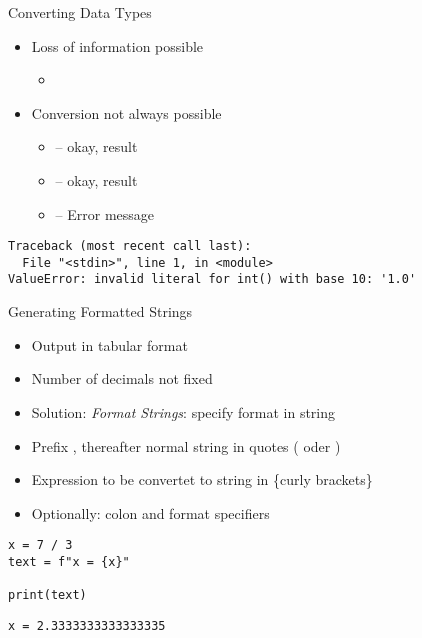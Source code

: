 \begin{frame}[fragile]{Converting Data Types}
%
\begin{itemize}
\item Loss of information possible
	\begin{itemize}
	\item {} \thus~ 
	\end{itemize}
\item Conversion not always possible
	\begin{itemize}
	\item {} -- okay, result 
	\item {} -- okay, result 
	\item  {} -- Error message
	\end{itemize}
\end{itemize}
%
\begin{cmdbox}
\begin{verbatim}
Traceback (most recent call last):
  File "<stdin>", line 1, in <module>
ValueError: invalid literal for int() with base 10: '1.0'
\end{verbatim}
\end{cmdbox}
%
\end{frame}


\begin{frame}[fragile]{Generating Formatted Strings}
%
\begin{itemize}
\item Output in tabular format
\item Number of decimals not fixed
\item Solution: \emph{Format Strings}: specify format in string
\item Prefix , thereafter normal string in quotes ( oder )
\item Expression to be convertet to string in \{curly brackets\}
\item Optionally: colon and format specifiers
\end{itemize}
%
\begin{codebox}[Code: Format Strings (1), width=.5\linewidth, nobeforeafter, equal height group = grpFormatString1]
\begin{verbatim}
x = 7 / 3
text = f"x = {x}"

print(text)
\end{verbatim}
\end{codebox}
%
\begin{cmdbox}[Output: Format Strings (1), width=.49\linewidth, nobeforeafter, equal height group = grpFormatString1]
\begin{verbatim}
x = 2.3333333333333335
\end{verbatim}
\end{cmdbox}
%
\end{frame}

